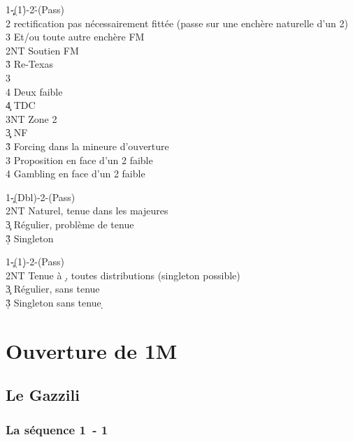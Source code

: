 \documentclass[a4paper]{article}
\begin{document}
\begin{bidtable}
1\c\d-(1\h)-2\h-(Pass)\\
2\s \> rectification pas nécessairement fittée (passe sur une enchère naturelle d'un 2\s )\+\\
3\s \> Et/ou toute autre enchère FM\-\\
2NT \> Soutien FM\+\\
3\h \> Re-Texas\+\\
3\s\+\\
4\s \> Deux faible\\
4\c \> TDC\\
3NT \> Zone 2\-\-\-\\
3\c\d \> NF\\
3\h \> Forcing dans la mineure d'ouverture\\
3\s \> Proposition en face d'un 2 faible\\
4\s \> Gambling en face d'un 2 faible
\end{bidtable}

\begin{bidtable}
1\c-(Dbl)-2\s-(Pass)\\
2NT \> Naturel, tenue dans les majeures\\
3\c \> Régulier, problème de tenue\\
3\d\h\s \> Singleton
\end{bidtable}

\begin{bidtable}
1\c-(1\d)-2\s-(Pass)\\
2NT \> Tenue à \d , toutes distributions (singleton possible)\\
3\c \> Régulier, sans tenue \d \\
3\d\h\s \> Singleton sans tenue \d 
\end{bidtable}

\section{Ouverture de 1M}

\subsection{Le Gazzili}

\subsubsection{La séquence 1\pdfh\ - 1\pdfs}
\end{document}
